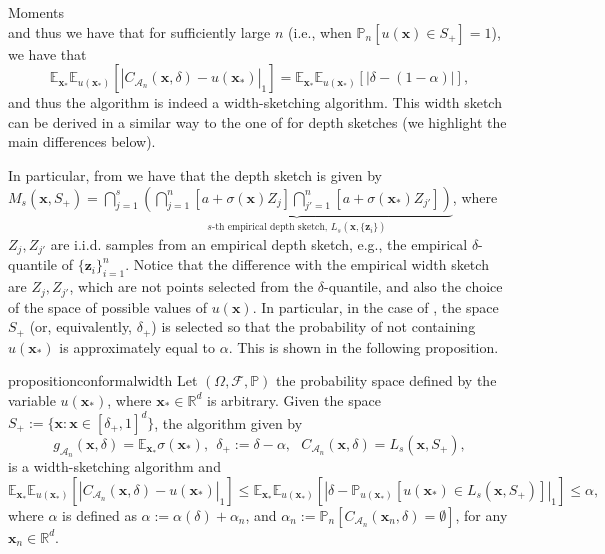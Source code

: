 \begin{assumptioni}[i.i.d data]
\begin{assumptioni}
\begin{assumptioni}{Moments}
\begin{equation}
\end{equation}
and thus we have that for sufficiently large $n$ (i.e., when $\mathbb{P}_n[ u(\bm{x}) \in S_+] = 1$), we have that  
\begin{equation} \label{eq:width_sketch_bias2}
\mathbb{E}_{\bm{x}_*} \mathbb{E}_{u(\bm{x_*})}[|C_{\mathcal{A}_n}(\bm{x},\delta) - u(\bm{x_*})|_1] = \mathbb{E}_{\bm{x}_*} \mathbb{E}_{u(\bm{x_*})}[|\delta - (1 - \alpha)|],
\end{equation}
and thus the algorithm is indeed a width-sketching algorithm. This width sketch can be derived in a similar way to the one of \cite{angelopoulos2024conformal} for depth sketches (we highlight the main differences below).

In particular, from \cite{angelopoulos2024conformal} we have that the depth sketch is given by $M_s(\bm{x}, S_+) = \bigcap_{j=1}^{s} \underbrace{\left(\bigcap_{j=1}^{n} \left[a + \sigma(\bm{x}) Z_{j} \right]\bigcap_{j'=1}^{n} \left[a + \sigma(\bm{x_*}) Z_{j'} \right]\right)}_{\text{$s$-th empirical depth sketch, }L_s(\bm{x},\{ \bm{z}_i \})}$, where $Z_j,Z_{j'}$ are i.i.d. samples from an empirical depth sketch, e.g., the empirical $\delta$-quantile of $\{ \bm z_i \}_{i=1}^{n}$. Notice that the difference with the empirical width sketch are $Z_j,Z_{j'}$, which are not points selected from the $\delta$-quantile, and also the choice of the space of possible values of $u(\bm{x})$. In particular, in the case of \cite{angelopoulos2024conformal}, the space $S_+$ (or, equivalently, $\delta_{+}$) is selected so that the probability of not containing $u(\bm{x_*})$ is approximately equal to $\alpha$. This is shown in the following proposition.
\begin{restatable}{proposition}{conformalwidth}\label{prop:conformal_width}
  Let $(\Omega,\mathcal{F},\mathbb{P})$ the probability space defined by the variable $u(\bm{x_*})$, where $\bm{x_*} \in \mathbb{R}^d$ is arbitrary. Given the space $S_+ := \{\bm{x}: \bm{x} \in [\delta_+,1] ^d\}$, the algorithm given by 
  \begin{equation} 
  g_{\mathcal{A}_n}(\bm{x},\delta) = \mathbb{E}_{\bm{x}_*} \sigma(\bm{x_*}),~~\delta_{+} := \delta - \alpha,~~~C_{\mathcal{A}_n}(\bm{x},\delta) = L_s(\bm{x},S_+),
\end{equation}
is a width-sketching algorithm and
\begin{equation}
\mathbb{E}_{\bm{x}_*} \mathbb{E}_{u(\bm{x_*})}[|C_{\mathcal{A}_n}(\bm{x},\delta) - u(\bm{x_*})|_1]  \leq \mathbb{E}_{\bm{x}_*} \mathbb{E}_{u(\bm{x_*})}[|\delta - \mathbb{P}_{u(\bm{x_*})}[u(\bm{x_*}) \in L_s(\bm{x},S_+)]|_1] \leq \alpha,
\end{equation}
where $\alpha$ is defined as $\alpha :=\alpha(\delta) + \alpha_n$, and $\alpha_n :=\mathbb{P}_n[C_{\mathcal{A}_n}(\bm{x}_n,\delta) = \emptyset]$, for any $\bm{x}_n \in \mathbb{R}^d$. 
\end{restatable}



\end{assumptioni}
\end{assumptioni}
\end{assumptioni}
